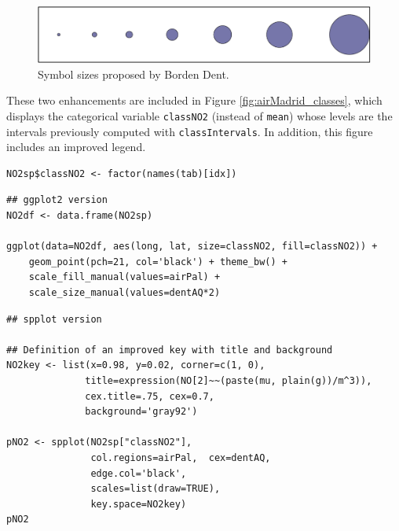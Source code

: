 \documentclass[smallroyalvopaper]{memoir}
\begin{document}
\begin{figure}[htb]
\centering
\includegraphics[width=.9\linewidth]{figs/dent.pdf}
\caption{\label{fig:dent}Symbol sizes proposed by Borden Dent.}
\end{figure}

These two enhancements are included in Figure
\ref{fig:airMadrid_classes}, which displays the categorical variable
\texttt{classNO2} (instead of \texttt{mean}) whose levels are the intervals
previously computed with \texttt{classIntervals}. In addition, this
figure includes an improved legend.

\lstset{language=R,numbers=none}
\begin{lstlisting}
NO2sp$classNO2 <- factor(names(tab)[idx])
\end{lstlisting}

\lstset{language=R,numbers=none}
\begin{lstlisting}
## ggplot2 version
NO2df <- data.frame(NO2sp)

ggplot(data=NO2df, aes(long, lat, size=classNO2, fill=classNO2)) +
    geom_point(pch=21, col='black') + theme_bw() +
    scale_fill_manual(values=airPal) +
    scale_size_manual(values=dentAQ*2)
\end{lstlisting}

\lstset{language=R,numbers=none}
\begin{lstlisting}
## spplot version

## Definition of an improved key with title and background
NO2key <- list(x=0.98, y=0.02, corner=c(1, 0),
              title=expression(NO[2]~~(paste(mu, plain(g))/m^3)),
              cex.title=.75, cex=0.7,
              background='gray92')

pNO2 <- spplot(NO2sp["classNO2"],
               col.regions=airPal,  cex=dentAQ,
               edge.col='black',
               scales=list(draw=TRUE),
               key.space=NO2key)
pNO2
\end{lstlisting}
\end{document}
